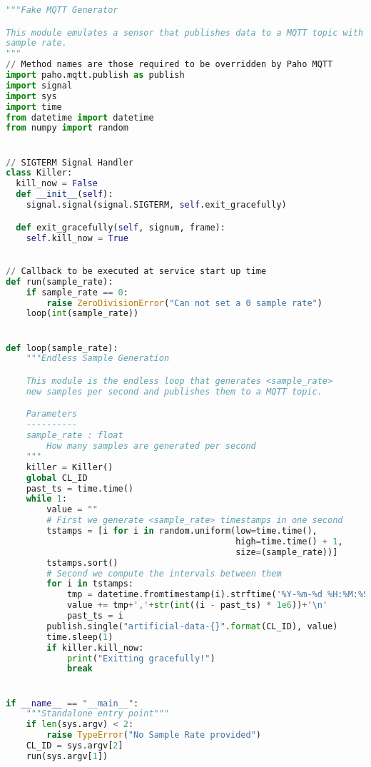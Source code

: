 \begin{lstlisting}[language=Python,caption={Implementation of the \texttt{sensor} service.},label=code:sensor]
"""Fake MQTT Generator

This module emulates a sensor that publishes data to a MQTT topic with a given
sample rate.
"""
// Method names are those required to be overridden by Paho MQTT
import paho.mqtt.publish as publish 
import signal
import sys
import time
from datetime import datetime
from numpy import random


// SIGTERM Signal Handler
class Killer:
  kill_now = False
  def __init__(self):
    signal.signal(signal.SIGTERM, self.exit_gracefully)

  def exit_gracefully(self, signum, frame):
    self.kill_now = True

    
// Callback to be executed at service start up time
def run(sample_rate):
    if sample_rate == 0:
        raise ZeroDivisionError("Can not set a 0 sample rate")
    loop(int(sample_rate))


def loop(sample_rate):
    """Endless Sample Generation

    This module is the endless loop that generates <sample_rate>
    new samples per second and publishes them to a MQTT topic.

    Parameters
    ----------
    sample_rate : float
        How many samples are generated per second
    """
    killer = Killer()
    global CL_ID
    past_ts = time.time()
    while 1:
        value = ""
        # First we generate <sample_rate> timestamps in one second
        tstamps = [i for i in random.uniform(low=time.time(),
                                             high=time.time() + 1,
                                             size=(sample_rate))]
        tstamps.sort()
        # Second we compute the intervals between them
        for i in tstamps:
            tmp = datetime.fromtimestamp(i).strftime('%Y-%m-%d %H:%M:%S')
            value += tmp+','+str(int((i - past_ts) * 1e6))+'\n'
            past_ts = i
        publish.single("artificial-data-{}".format(CL_ID), value)
        time.sleep(1)
        if killer.kill_now:
            print("Exitting gracefully!")
            break


if __name__ == "__main__":
    """Standalone entry point"""
    if len(sys.argv) < 2:
        raise TypeError("No Sample Rate provided")
    CL_ID = sys.argv[2]
    run(sys.argv[1])
\end{lstlisting}

